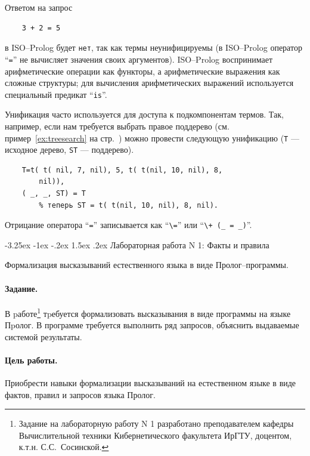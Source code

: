 \documentclass[12pt, openany, twoside]{book} %
\makeatletter
\renewcommand\section{\@startsection {section}{1}{\z@}%
                                   {-3.25ex \@plus -1ex \@minus -.2ex}%
                                   {1.5ex \@plus.2ex}%
                                   {\normalfont\large\bfseries}}
\makeatother
\begin{document}
Ответом на запрос
{\tt\begin{verbatim}
    3 + 2 = 5
\end{verbatim}}
\noindent в ISO--Prolog будет {\tt нет}, так как термы неунифицируемы (в ISO--Prolog оператор ``{\tt =}'' не вычисляет значения своих аргументов). ISO--Prolog воспринимает арифметические операции как функторы, а арифметические выражения как сложные структуры; для вычисления арифметических выражений используется специальный предикат ``{\tt is}''. %

Унификация часто используется для доступа к подкомпонентам термов. Так, например, если нам требуется выбрать правое поддерево (см. пример~\ref{ex:treesearch} на стр.~\pageref{ex:treesearch}) можно провести следующую унификацию ({\tt T} --- исходное дерево, {\tt ST} --- поддерево).
{\tt\begin{verbatim}
    T=t( t( nil, 7, nil), 5, t( t(nil, 10, nil), 8,
        nil)),
    ( _, _, ST) = T
        % теперь ST = t( t(nil, 10, nil), 8, nil).
\end{verbatim}}

Отрицание оператора ``{\tt =}'' записывается как ``{\tt \verb|\=|}'' или ``{\tt \verb|\+| (\_ = \_)}''.

\section{Лабораторная работа N 1: Факты и правила}

Формализация высказываний естественного языка в виде Про\-лог--прог\-рам\-мы.

\paragraph{Задание.} В pаботе\footnote{Задание на лабораторную работу N 1 разработано преподавателем кафедры Вычислительной техники Кибернетического факультета ИрГТУ, доцентом, к.т.н. С.С.~Сосинской.} тpебуется формализовать высказывания в виде программы на языке Пpолог. В программе требуется выполнить ряд запросов, объяснить выдаваемые системой результаты.

\paragraph{Цель работы.} Приобрести навыки формализации высказываний на естественном языке в виде фактов, правил и запросов языка Пролог.
\end{document}
